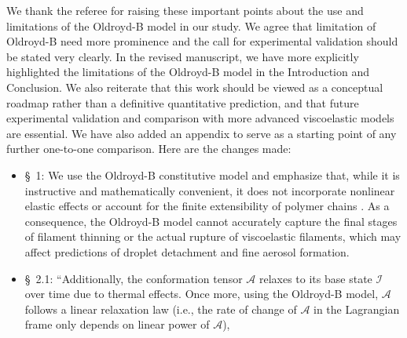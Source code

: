 \documentclass[]{article}
\newcommand{\vsy}[1]{\todo[color=orange, bordercolor=none, textcolor=white]{Vatsal}\textcolor{orange}{#1}}
\newcommand{\oo}{\color{magenta} \normalfont}
\newcommand{\bb}{\color{black} \normalfont}
\begin{document}
\begin{enumerate}
\begin{enumerate}
\begin{itemize}

     \end{itemize}

     We thank the referee for raising these important points about the use and limitations of the Oldroyd-B model in our study. We agree that limitation of Oldroyd-B need more prominence and the call for experimental validation should be stated very clearly. In the revised manuscript, we have more explicitly highlighted the limitations of the Oldroyd-B model in the Introduction and Conclusion. We also reiterate that this work should be viewed as a conceptual roadmap rather than a definitive quantitative prediction, and that future experimental validation and comparison with more advanced viscoelastic models are essential. We have also added an appendix to serve as a starting point of any further one-to-one comparison. Here are the changes made: 


     \begin{itemize}
        \item \S~1: \oo We use the Oldroyd-B constitutive model and emphasize that, while it is instructive and mathematically convenient, it does not incorporate nonlinear elastic effects \citep{alves2021numerical} or account for the finite extensibility of polymer chains \citep{yamani2023master}. As a consequence, the Oldroyd-B model cannot accurately capture the final stages of filament thinning or the actual rupture of viscoelastic filaments, which may affect predictions of droplet detachment and fine aerosol formation.\bb\,
        \item \S~2.1: ``Additionally, the conformation tensor $ \boldsymbol{\mathcal{A}}$ relaxes to its base state $\boldsymbol{\mathcal{I}}$ over time due to thermal effects.
        Once more, using the Oldroyd-B model, $ \boldsymbol{\mathcal{A}}$ follows a linear relaxation law \oo (i.e., the rate of change of $\boldsymbol{\mathcal{A}}$ in the Lagrangian frame only depends on linear power of $\boldsymbol{\mathcal{A}}$),\bb\,


\end{itemize}
\end{enumerate}
\end{enumerate}
\end{document}
